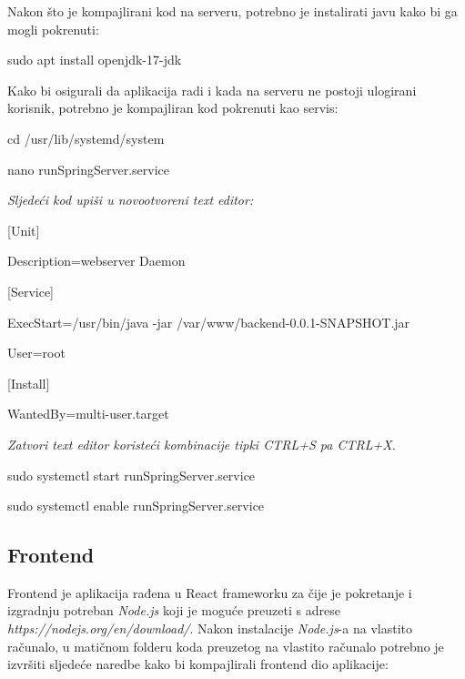                 {Nakon što je kompajlirani kod na serveru, potrebno je instalirati javu kako bi ga mogli pokrenuti:}

                \begin{packed_item}
        			\item {sudo apt install openjdk-17-jdk}
        		\end{packed_item}

                {Kako bi osigurali da aplikacija radi i kada na serveru ne postoji ulogirani korisnik, potrebno je kompajliran kod pokrenuti kao servis:}

                \begin{packed_item}
        			\item {cd /usr/lib/systemd/system}
        			\item {nano runSpringServer.service}
        			\item \textit{Sljedeći kod upiši u novootvoreni text editor:}
        			\item {[Unit]}
                    \item {Description=webserver Daemon}
                    \item {[Service]}
                    \item {ExecStart=/usr/bin/java -jar /var/www/backend-0.0.1-SNAPSHOT.jar}
                    \item {User=root}
                    \item {[Install]}
                    \item {WantedBy=multi-user.target}
        			\item \textit{Zatvori text editor koristeći kombinacije tipki CTRL+S pa CTRL+X.}
        			\item {sudo systemctl start runSpringServer.service}
        			\item {sudo systemctl enable runSpringServer.service}
        		\end{packed_item}

            \subsection{Frontend}

                {Frontend je aplikacija rađena u React frameworku za čije je pokretanje i izgradnju potreban \textit{Node.js} koji je moguće preuzeti s adrese \textit{https://nodejs.org/en/download/}. Nakon instalacije \textit{Node.js}-a na vlastito računalo, u matičnom folderu koda preuzetog na vlastito računalo potrebno je izvršiti sljedeće naredbe kako bi kompajlirali frontend dio aplikacije:}

